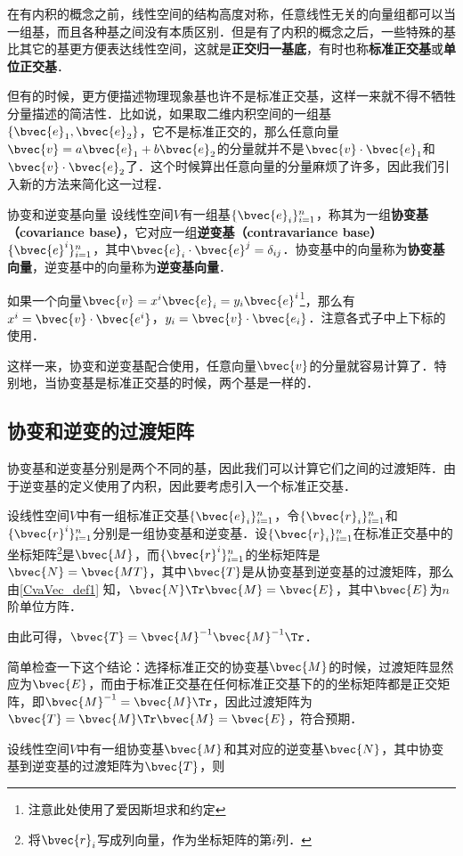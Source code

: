 

在有内积的概念之前，线性空间的结构高度对称，任意线性无关的向量组都可以当一组基，而且各种基之间没有本质区别．但是有了内积的概念之后，一些特殊的基比其它的基更方便表达线性空间，这就是\textbf{正交归一基底}，有时也称\textbf{标准正交基}或\textbf{单位正交基}．

但有的时候，更方便描述物理现象基也许不是标准正交基，这样一来就不得不牺牲分量描述的简洁性．比如说，如果取二维内积空间的一组基$\{\bvec{e}_1, \bvec{e}_2\}$，它不是标准正交的，那么任意向量$\bvec{v}=a\bvec{e}_1+b\bvec{e}_2$的分量就并不是$\bvec{v}\cdot\bvec{e}_1$和$\bvec{v}\cdot\bvec{e}_2$了．这个时候算出任意向量的分量麻烦了许多，因此我们引入新的方法来简化这一过程．

\begin{definition}{协变和逆变基向量}\label{CvaVec_def1}
设线性空间$V$有一组基$\{\bvec{e}_i\}_{i=1}^n$，称其为一组\textbf{协变基（covariance base）}，它对应一组\textbf{逆变基（contravariance base）}$\{\bvec{e}^i\}_{i=1}^n$，其中$\bvec{e}_i\cdot\bvec{e}^j=\delta_{ij}$．协变基中的向量称为\textbf{协变基向量}，逆变基中的向量称为\textbf{逆变基向量}．
\end{definition}

如果一个向量$\bvec{v}=x^i\bvec{e}_i=y_i\bvec{e}^i$\footnote{注意此处使用了爱因斯坦求和约定}，那么有$x^i=\bvec{v}\cdot\bvec{e^i}$，$y_i=\bvec{v}\cdot\bvec{e_i}$．注意各式子中上下标的使用．

这样一来，协变和逆变基配合使用，任意向量$\bvec{v}$的分量就容易计算了．特别地，当协变基是标准正交基的时候，两个基是一样的．

\subsection{协变和逆变的过渡矩阵}


协变基和逆变基分别是两个不同的基，因此我们可以计算它们之间的过渡矩阵．由于逆变基的定义使用了内积，因此要考虑引入一个标准正交基．

设线性空间$V$中有一组标准正交基$\{\bvec{e}_i\}^n_{i=1}$，令$\{\bvec{r}_i\}^n_{i=1}$和$\{\bvec{r}^i\}^n_{i=1}$分别是一组协变基和逆变基．设$\{\bvec{r}_i\}^n_{i=1}$在标准正交基中的坐标矩阵\footnote{将$\bvec{r}_i$写成列向量，作为坐标矩阵的第$i$列．}是$\bvec{M}$，而$\{\bvec{r}^i\}^n_{i=1}$的坐标矩阵是$\bvec{N}=\bvec{MT}$，其中$\bvec{T}$是从协变基到逆变基的过渡矩阵，那么由\autoref{CvaVec_def1} 知，$\bvec{N}\Tr\bvec{M}=\bvec{E}$，其中$\bvec{E}$为$n$阶单位方阵．

由此可得，$\bvec{T}=\bvec{M}^{-1}{\bvec{M}^{-1}}\Tr$．

简单检查一下这个结论：选择标准正交的协变基$\bvec{M}$的时候，过渡矩阵显然应为$\bvec{E}$，而由于标准正交基在任何标准正交基下的的坐标矩阵都是正交矩阵，即$\bvec{M}^{-1}=\bvec{M}\Tr$，因此过渡矩阵为$\bvec{T}=\bvec{M}\Tr\bvec{M}=\bvec{E}$，符合预期．

\begin{definition}{}
设线性空间$V$中有一组协变基$\bvec{M}$和其对应的逆变基$\bvec{N}$，其中协变基到逆变基的过渡矩阵为$\bvec{T}$，则
\end{definition}


